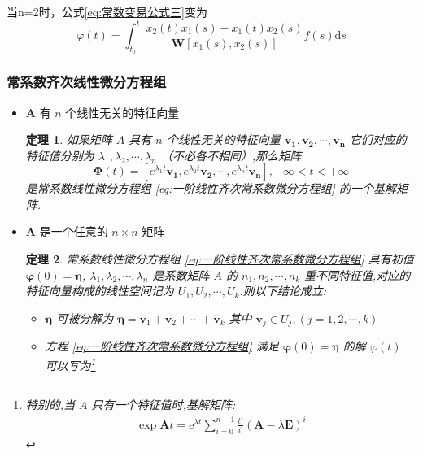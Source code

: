 \documentclass{ctexart}
\newtheorem{theorem}{定理}[section]
\numberwithin{equation}{subsection}
\begin{document}
\textcolor[rgb]{1,0,0}{
当n=2时，公式\eqref{eq:常数变易公式三}变为\begin{equation}
        \label{eq:常数变易公式四}
        \varphi(t)=\int_{t_0}^t  \frac{x_2(t)x_1(s)-x_1(t)x_2(s) }{\boldsymbol{W}[x_1(s),x_2(s)]}  f(s) \mathrm{d} s
\end{equation}
}
\subsubsection{\textcolor[rgb]{1,0,0}{常系数齐次线性微分方程组}}
\begin{itemize}
        \item \textcolor[rgb]{1,0,0}{$\boldsymbol{A}$ 有 $n$ 个线性无关的特征向量}
        \begin{theorem}
        如果矩阵 $A$ 具有 $n$ 个线性无关的特征向量 $\boldsymbol{v_1},\boldsymbol{v_2},\cdots,\boldsymbol{v_n}$ 它们对应的特征值分别为 $\lambda_1,\lambda_2,\cdots,\lambda_n$ （不必各不相同）,那么矩阵
        \[\boldsymbol{\Phi}(t)=[e^{\lambda_1t}\boldsymbol{v_1},e^{\lambda_2t}\boldsymbol{v_2},\cdots,e^{\lambda_nt}\boldsymbol{v_n}],-\infty<t<+\infty\]
        是常系数线性微分方程组 \eqref{eq:一阶线性齐次常系数微分方程组} 的一个基解矩阵.
        \end{theorem}
        \item \textcolor[rgb]{1,0,0}{$\boldsymbol{A}$ 是一个任意的 $n\times n$ 矩阵}
        \begin{theorem}
        常系数线性微分方程组 \eqref{eq:一阶线性齐次常系数微分方程组} 具有初值 $\boldsymbol{\varphi}(0)=\boldsymbol{\eta}$,  $\lambda_1,\lambda_2,\cdots,\lambda_n$ 是系数矩阵 $A$ 的 $n_1,n_2,\cdots,n_k$ 重不同特征值,对应的特征向量构成的线性空间记为 $U_1,U_2,\cdots,U_k$.则以下结论成立:
        \begin{itemize}
        \item  $\boldsymbol{\eta}$ 可被分解为 $\boldsymbol{\eta}=\boldsymbol{v}_1+\boldsymbol{v}_2+\cdots+\boldsymbol{v}_k$ 其中 $\boldsymbol{v}_j\in U_j,(j=1,2,\cdots,k)$

         \item 方程 \eqref{eq:一阶线性齐次常系数微分方程组} 满足 $\boldsymbol{\varphi}(0)=\boldsymbol{\eta}$ 的解 $\varphi(t)$ 可以写为\footnote{特别的,当 $A$ 只有一个特征值时,基解矩阵:\[\begin{aligned} \exp \boldsymbol{A} t=\mathrm{e}^{\lambda t} \sum_{i=0}^{n-1} \frac{t^{i}}{i !}(\boldsymbol{A}-\lambda \boldsymbol{E})^{i} \end{aligned}\]
                                
}
\end{itemize}
\end{theorem}
\end{itemize}
\end{document}
